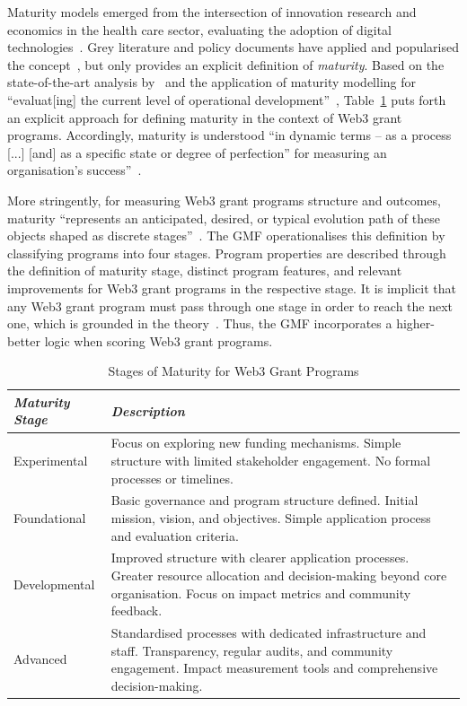 \documentclass[conference]{IEEEtran}
\begin{document}
Maturity models emerged from the intersection of innovation research and economics in the health care sector, evaluating the adoption of digital technologies~\cite{van_ede_assembling_2024,knosp_research_2018}. Grey literature and policy documents have applied and popularised the concept~\cite[see also]{dener_govtech_2021,queensland_audit_office_risk_2023}, but only \cite{kucinska-landwojtowicz_organizational_2023} provides an explicit definition of \textit{maturity}. Based on the state-of-the-art analysis by~\cite{kucinska-landwojtowicz_organizational_2023} and the application of maturity modelling for ``evaluat[ing] the current level of operational development''~\cite{yatskovskaya_integrated_2018}, Table~\ref{tab:grant_maturity} puts forth an explicit approach for defining maturity in the context of Web3 grant programs. Accordingly, maturity is understood ``in dynamic terms – as a process [...] [and] as a specific state or degree of perfection'' for measuring an organisation's success''~\cite[p.~62]{kucinska-landwojtowicz_organizational_2023}.

More stringently, for measuring Web3 grant programs structure and outcomes, maturity ``represents an anticipated, desired, or typical evolution path of these objects shaped as discrete stages''~\cite[p.~213]{becker_developing_2009}. The GMF operationalises this definition by classifying programs into four stages. Program properties are described through the definition of maturity stage, distinct program features, and relevant improvements for Web3 grant programs in the respective stage. It is implicit that any Web3 grant program must pass through one stage in order to reach the next one, which is grounded in the theory~\cite{yatskovskaya_integrated_2018}. Thus, the GMF incorporates a higher-better logic when scoring Web3 grant programs.

\begin{table}[htbp]
\caption{Stages of Maturity for Web3 Grant Programs}
\centering
\footnotesize
\begin{tabular}{p{2cm}p{6cm}}
\hline
\textbf{\textit{Maturity Stage}} & \textbf{\textit{Description}} \\
\hline
Experimental & Focus on exploring new funding mechanisms. Simple structure with limited stakeholder engagement. No formal processes or timelines. \\
\hline
Foundational & Basic governance and program structure defined. Initial mission, vision, and objectives. Simple application process and evaluation criteria. \\
\hline
Developmental & Improved structure with clearer application processes. Greater resource allocation and decision-making beyond core organisation. Focus on impact metrics and community feedback. \\
\hline
Advanced & Standardised processes with dedicated infrastructure and staff. Transparency, regular audits, and community engagement. Impact measurement tools and comprehensive decision-making. \\
\hline
\end{tabular}
\label{tab:grant_maturity}
\end{table}
\end{document}
